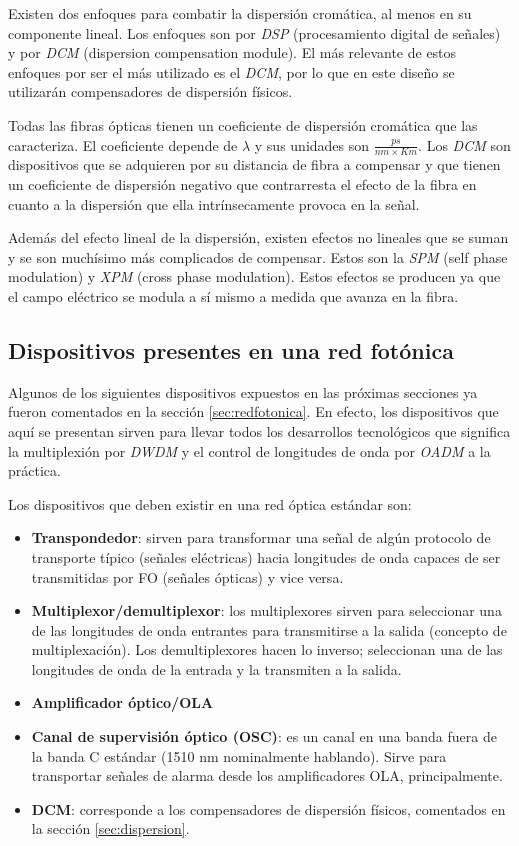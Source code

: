 Existen dos enfoques para combatir la dispersión cromática, al menos
en su componente lineal. Los enfoques son por \emph{DSP}
(procesamiento digital de señales) y por \emph{DCM} (dispersion
compensation module). El más relevante de estos enfoques por ser el
más utilizado es el \emph{DCM}, por lo que en este diseño se
utilizarán compensadores de dispersión físicos.

Todas las fibras ópticas tienen un coeficiente de dispersión cromática
que las caracteriza. El coeficiente depende de $\lambda$ y sus
unidades son $\frac{ps}{nm \times Km}$. Los \emph{DCM} son dispositivos
que se adquieren por su distancia de fibra a compensar y que tienen un
coeficiente de dispersión negativo que contrarresta el efecto de la
fibra en cuanto a la dispersión que ella intrínsecamente provoca en la
señal.

Además del efecto lineal de la dispersión, existen efectos no lineales
que se suman y se son muchísimo más complicados de compensar. Estos
son la \emph{SPM} (self phase modulation) y \emph{XPM} (cross phase
modulation). Estos efectos se producen ya que el campo eléctrico se
modula a sí mismo a medida que avanza en la fibra.

\subsection{Dispositivos presentes en una red fotónica}
\label{sec:dispositivos}

Algunos de los siguientes dispositivos expuestos en las próximas
secciones ya fueron comentados en la sección \ref{sec:redfotonica}. En
efecto, los dispositivos que aquí se presentan sirven para llevar
todos los desarrollos tecnológicos que significa la multiplexión por
\emph{DWDM} y el control de longitudes de onda por \emph{OADM} a la
práctica.

Los dispositivos que deben existir en una red óptica estándar son:
\begin{itemize}
\item \textbf{Transpondedor}: sirven para transformar una señal de
  algún protocolo de transporte típico (señales eléctricas) hacia
  longitudes de onda capaces de ser transmitidas por FO (señales
  ópticas) y vice versa.
\item \textbf{Multiplexor/demultiplexor}: los multiplexores sirven
  para seleccionar una de las longitudes de onda entrantes para
  transmitirse a la salida (concepto de multiplexación). Los
  demultiplexores hacen lo inverso; seleccionan una de las longitudes
  de onda de la entrada y la transmiten a la salida.
\item \textbf{Amplificador óptico/OLA}
\item \textbf{Canal de supervisión óptico (OSC)}: es un canal en una
  banda fuera de la banda C estándar (1510 nm nominalmente
  hablando). Sirve para transportar señales de alarma desde los
  amplificadores OLA, principalmente.
\item \textbf{DCM}: corresponde a los compensadores de dispersión
  físicos, comentados en la sección \ref{sec:dispersion}.
\end{itemize}

